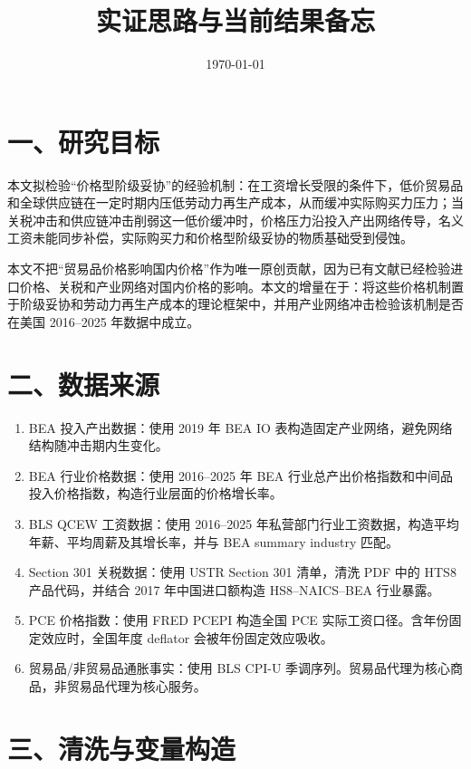 \documentclass[11pt]{ctexart}
\title{实证思路与当前结果备忘}
\author{}
\date{\today}
\begin{document}
\maketitle

\section*{一、研究目标}

本文拟检验“价格型阶级妥协”的经验机制：在工资增长受限的条件下，低价贸易品和全球供应链在一定时期内压低劳动力再生产成本，从而缓冲实际购买力压力；当关税冲击和供应链冲击削弱这一低价缓冲时，价格压力沿投入产出网络传导，名义工资未能同步补偿，实际购买力和价格型阶级妥协的物质基础受到侵蚀。

本文不把“贸易品价格影响国内价格”作为唯一原创贡献，因为已有文献已经检验进口价格、关税和产业网络对国内价格的影响。本文的增量在于：将这些价格机制置于阶级妥协和劳动力再生产成本的理论框架中，并用产业网络冲击检验该机制是否在美国 2016--2025 年数据中成立。

\section*{二、数据来源}

\begin{enumerate}
  \item BEA 投入产出数据：使用 2019 年 BEA IO 表构造固定产业网络，避免网络结构随冲击期内生变化。
  \item BEA 行业价格数据：使用 2016--2025 年 BEA 行业总产出价格指数和中间品投入价格指数，构造行业层面的价格增长率。
  \item BLS QCEW 工资数据：使用 2016--2025 年私营部门行业工资数据，构造平均年薪、平均周薪及其增长率，并与 BEA summary industry 匹配。
  \item Section 301 关税数据：使用 USTR Section 301 清单，清洗 PDF 中的 HTS8 产品代码，并结合 2017 年中国进口额构造 HS8--NAICS--BEA 行业暴露。
  \item PCE 价格指数：使用 FRED PCEPI 构造全国 PCE 实际工资口径。含年份固定效应时，全国年度 deflator 会被年份固定效应吸收。
  \item 贸易品/非贸易品通胀事实：使用 BLS CPI-U 季调序列。贸易品代理为核心商品，非贸易品代理为核心服务。
\end{enumerate}

\section*{三、清洗与变量构造}
\end{document}
